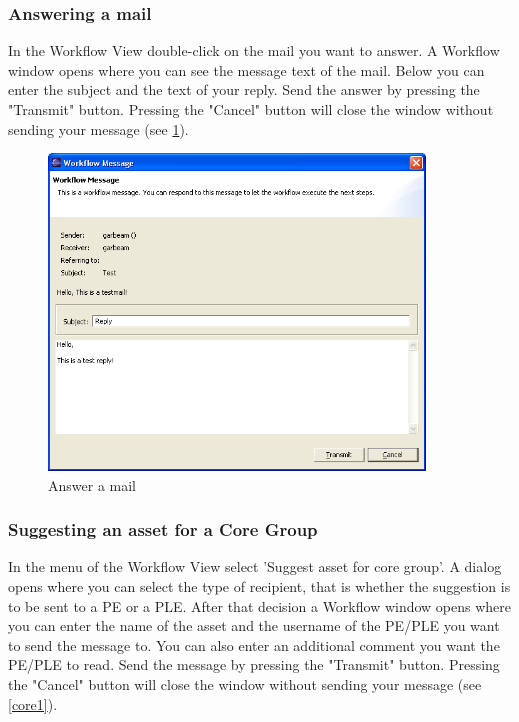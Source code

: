 \subsubsection{Answering a mail}

In the Workflow View double-click on the mail you want to answer. A Workflow
window opens where you can see the message text of the mail. Below you can enter
the subject and the text of your reply. Send the answer by pressing the "Transmit" 
button. Pressing the "Cancel" button will close the window without sending 
your message (see \ref{answermail}).

\begin{figure}[h!]
\begin{center}
\includegraphics[width=10cm]{answermail.png}
   \caption{Answer a mail}
\label{answermail}
\end{center}
\end{figure}\par

\subsubsection{Suggesting an asset for a Core Group}

In the menu of the Workflow View select 'Suggest asset for core group'. A dialog opens where
 you can select the type of recipient, that is whether the suggestion is to be sent to a PE or a PLE. After
 that decision a Workflow
window opens where you can enter the name of the asset and the username of the
PE/PLE you want to send the message to. You can also enter an additional comment you want 
the PE/PLE to read. Send the message by pressing the "Transmit" 
button. Pressing the "Cancel" button will close the window without sending 
your message (see \ref{core1}).


